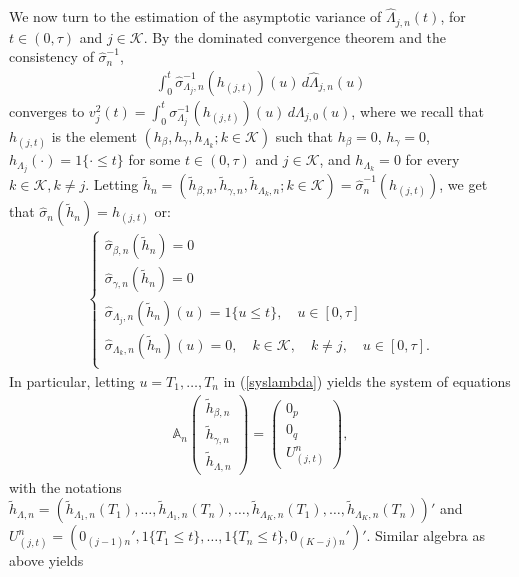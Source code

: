 \documentclass{statsoc}
\begin{document}
We now turn to the estimation of the asymptotic variance of $\widehat \Lambda_{j,n}(t)$, for $t\in (0,\tau)$ and $j\in\mathcal K$. By the dominated convergence theorem and the consistency of $\widehat \sigma_n^{-1}$,
\begin{eqnarray*}
\int_0^t\widehat \sigma_{\Lambda_j,n}^{-1}(h_{(j,t)})(u)\,d\widehat\Lambda_{j,n}(u)
\end{eqnarray*}
converges to $v_j^2(t)=\int_0^t \sigma_{\Lambda_j}^{-1}(h_{(j,t)})(u)\, d\Lambda_{j,0}(u)$, where we recall that $h_{(j,t)}$ is the element $(h_\beta, h_\gamma, h_{\Lambda_k}; k\in\mathcal K)$ such that $h_\beta=0$, $h_\gamma=0$, $h_{\Lambda_j}(\cdot)=1\{\cdot\leq t\}$ for some $t\in(0,\tau)$ and $j\in\mathcal K$, and $h_{\Lambda_k}=0$ for every $k\in\mathcal K, k\neq j$. Letting $\widetilde h_n=(\widetilde h_{\beta,n}, \widetilde h_{\gamma,n}, \widetilde h_{\Lambda_k,n}; k\in \mathcal K)=\widehat \sigma_n^{-1}(h_{(j,t)})$, we get that $\widehat \sigma_n(\widetilde h_n)=h_{(j,t)}$ or:
\begin{eqnarray}\label{syslambda}
\left\{
\begin{array}{l}
\widehat \sigma_{\beta,n}(\widetilde h_n)=0\\
\widehat \sigma_{\gamma,n}(\widetilde h_n)=0\\
\widehat \sigma_{\Lambda_j,n}(\widetilde h_n)(u)=1\{u\leq t\}, \quad u\in[0,\tau]\\
\widehat \sigma_{\Lambda_k,n}(\widetilde h_n)(u)=0, \quad k\in\mathcal K, \quad k\neq j, \quad u\in[0,\tau].\\
\end{array}\right.
\end{eqnarray}
In particular, letting $u=T_1,\ldots,T_n$ in (\ref{syslambda}) yields the system of equations
\begin{eqnarray*}
\mathbb A_n\left(
\begin{array}{c}
\widetilde h_{\beta,n}\\
\widetilde h_{\gamma,n}\\
\widetilde h_{\Lambda,n}
\end{array}
\right)=\left(
\begin{array}{l}
0_p\\
0_q\\
U_{(j,t)}^n
\end{array}
\right),
\end{eqnarray*}
with the notations $\widetilde h_{\Lambda,n}=(\widetilde h_{\Lambda_1,n}(T_1), \ldots,\widetilde h_{\Lambda_1,n}(T_n),\ldots, \widetilde h_{\Lambda_K,n}(T_1), \ldots, \widetilde h_{\Lambda_K,n}(T_n))'$ and $U_{(j,t)}^n=(0_{(j-1)n}',1\{T_1\leq t\},\ldots,1\{T_n\leq t\},0_{(K-j)n}')'$. Similar algebra as above yields
\end{document}
